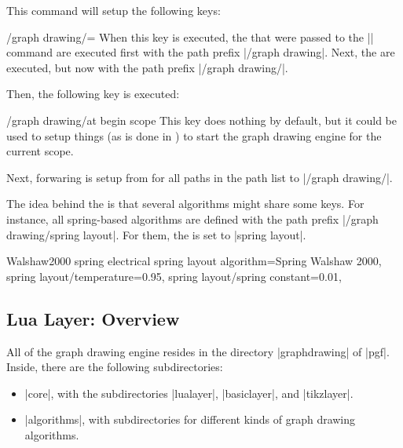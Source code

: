 \begin{command}{\pgfgddeclarealgorithmkey{}}
  This command will setup the following keys:
  
  \begin{key}{/graph drawing/=}
    When this key is executed, the  that were passed to
    the |\pgfgddeclarealgorithmkey| command are executed first with
    the path prefix |/graph drawing|. Next, the 
    are executed, but now with the path prefix
    |/graph drawing/|.

    Then, the following key is executed:
    \begin{key}{/graph drawing/at begin scope}
      This key does nothing by default, but it could be used to setup
      things (as is done in \tikzname) to start the graph drawing
      engine for the current scope. 
    \end{key}
  \end{key}

  Next, forwaring is setup from  for all paths in
  the path list to |/graph drawing/|.
  
  The idea behind the  is that several
  algorithms might share some keys. For
  instance, all spring-based algorithms are defined with the path
  prefix |/graph drawing/spring layout|. For them, the
   is set to |spring layout|.
\begin{codeexample}
\pgfgddeclarealgorithmkey
  {Walshaw2000 spring electrical}
  {spring layout}
  {
    algorithm=Spring Walshaw 2000,
    spring layout/temperature=0.95,
    spring layout/spring constant=0.01,
  }    
\end{codeexample}
\end{command}  




\subsection{Lua Layer: Overview}

All of the graph drawing engine resides in the directory
|graphdrawing| of |pgf|. Inside, there are the following
subdirectories:

\begin{itemize}
\item |core|, with the subdirectories |lualayer|, |basiclayer|, and |tikzlayer|.
\item |algorithms|, with subdirectories for different kinds of graph
  drawing algorithms.
\end{itemize}

